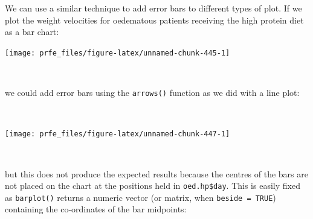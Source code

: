 \documentclass[12pt,a4paper]{book}
\newenvironment{Shaded}{\begin{snugshade}}{\end{snugshade}}
\newcommand{\DataTypeTok}[1]{\textcolor[rgb]{0.13,0.29,0.53}{#1}}
\newcommand{\DecValTok}[1]{\textcolor[rgb]{0.00,0.00,0.81}{#1}}
\newcommand{\FloatTok}[1]{\textcolor[rgb]{0.00,0.00,0.81}{#1}}
\newcommand{\KeywordTok}[1]{\textcolor[rgb]{0.13,0.29,0.53}{\textbf{#1}}}
\newcommand{\NormalTok}[1]{#1}
\newcommand{\OperatorTok}[1]{\textcolor[rgb]{0.81,0.36,0.00}{\textbf{#1}}}
\newcommand{\StringTok}[1]{\textcolor[rgb]{0.31,0.60,0.02}{#1}}
\theoremstyle{definition}
\theoremstyle{definition}
\theoremstyle{definition}
\theoremstyle{remark}
\begin{document}
We can use a similar technique to add error bars to different types of
plot. If we plot the weight velocities for oedematous patients receiving
the high protein diet as a bar chart:

\newpage

\begin{Shaded}
\end{Shaded}

\begin{center}\texttt{[image: prfe\_files/figure-latex/unnamed-chunk-445-1]} \end{center}

~

we could add error bars using the \texttt{arrows()} function as we did
with a line plot:

~

\begin{Shaded}
\end{Shaded}

\begin{center}\texttt{[image: prfe\_files/figure-latex/unnamed-chunk-447-1]} \end{center}

~

but this does not produce the expected results because the centres of
the bars are not placed on the chart at the positions held in
\texttt{oed.hp\$day}. This is easily fixed as \texttt{barplot()} returns
a numeric vector (or matrix, when \texttt{beside\ =\ TRUE}) containing
the co-ordinates of the bar midpoints:

\newpage
\end{document}
